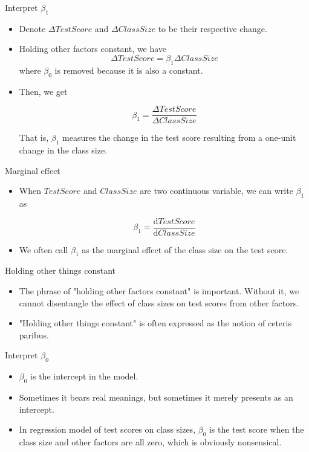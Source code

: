 \documentclass[presentation]{beamer}
\begin{document}
\begin{frame}[label={sec:org555890e}]{Interpret \(\beta_1\)}
\begin{itemize}
\item Denote \(\Delta TestScore\) and \(\Delta ClassSize\) to
be their respective change.

\item \alert{Holding other factors constant}, we have
\[ \Delta TestScore = \beta_1 \Delta ClassSize  \]
where \(\beta_0\) is removed because it is also a constant.

\item Then, we get

\[ \beta_1 = \frac{\Delta TestScore}{\Delta ClassSize} \]

That is, \(\beta_1\) measures the change in the test score resulting
from a \alert{one-unit change} in the class size.
\end{itemize}
\end{frame}

\begin{frame}[label={sec:org166f572}]{Marginal effect}
\begin{itemize}
\item When \(TestScore\) and
\(ClassSize\) are two continuous variable, we can write \(\beta_1\) as

\[\beta_1 = \frac{\mathrm{d} TestScore}{\mathrm{d} ClassSize}  \]

\item We often call \(\beta_1\) as the \alert{marginal effect} of the class
size on the test score.
\end{itemize}
\end{frame}

\begin{frame}[label={sec:orgb35c3fc}]{Holding other things constant}
\begin{itemize}
\item The phrase of "holding other factors constant" is important. Without
it, we cannot disentangle the effect of class sizes on test scores
from other factors.
\item "Holding other things constant" is often expressed
as the notion of \alert{ceteris paribus}.
\end{itemize}
\end{frame}

\begin{frame}[label={sec:org40b83a7}]{Interpret \(\beta_0\)}
\begin{itemize}
\item \(\beta_0\) is the intercept in the model.
\item Sometimes it bears real
meanings, but sometimes it merely presents as an intercept.
\item In regression model of test scores on class sizes, \(\beta_0\) is the
test score when the class size and other factors are all zero, which
is obviously nonsensical.
\end{itemize}
\end{frame}
\end{document}
